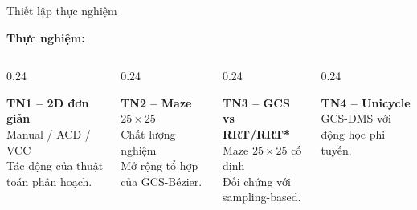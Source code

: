 \documentclass[aspectratio=169]{beamer}
\begin{document}
\begin{frame}{Thiết lập thực nghiệm}
    \vspace{-0.25em}

    {\footnotesize\textbf{Thực nghiệm:}}

    \vspace{0.25em}

    \begin{columns}[T,onlytextwidth]

        \begin{column}{0.24\textwidth}
            \raggedright
            {\scriptsize\textbf{TN1 -- 2D đơn giản}}\\[-0.15em]
            {\footnotesize Manual / ACD / VCC}\\[-0.15em]
            {\footnotesize Tác động của thuật toán phân hoạch.}
        \end{column}

        \begin{column}{0.24\textwidth}
            \raggedright
            {\scriptsize\textbf{TN2 -- Maze $25\!\times\!25$}}\\[-0.15em]
            {\footnotesize Chất lượng nghiệm \\ Mở rộng tổ hợp của GCS-Bézier.}
        \end{column}

        \begin{column}{0.24\textwidth}
            \raggedright
            {\scriptsize\textbf{TN3 -- GCS vs RRT/RRT*}}\\[-0.15em]
            {\footnotesize Maze $25\!\times\!25$ cố định}\\[-0.15em]
            {\footnotesize Đối chứng với sampling-based.}
        \end{column}

        \begin{column}{0.24\textwidth}
            \raggedright
            {\scriptsize\textbf{TN4 -- Unicycle}}\\[-0.15em]
            {\footnotesize GCS-DMS với động học phi tuyến.}
        \end{column}

    \end{columns}

\end{frame}
\end{document}
